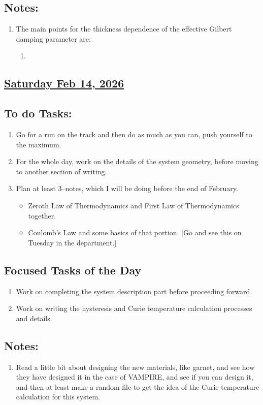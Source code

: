 \subsection*{Notes:}
\begin{enumerate}
    \item The main points for the thickness dependence of the effective Gilbert damping parameter are:
    \begin{enumerate}[\ding{212}]
        \item 
    \end{enumerate}
\end{enumerate}
\subsection*{\underline{Saturday Feb 14, 2026} }
\subsection*{To do Tasks:}
\begin{enumerate}
  \item Go for a run on the track and then do as much as you can, push yourself to the maximum. \cmark
  \item For the whole day, work on the details of the system geometry, before moving to another section of writing. \xmark    
\item Plan at least 3--notes, which I will be doing before the end of February. 
    \begin{itemize}
        \item Zeroth Law of Thermodynamics and First Law of Thermodynamics together.
        \item Coulomb's Law and some basics of that portion. [Go and see this on Tuesday in the  department.]
    \end{itemize}  
\end{enumerate}
\subsection*{Focused Tasks of the Day}
\begin{enumerate}[\ding{52}]  %
    \item Work on completing the system description part before proceeding forward.
    \item Work on writing the hysteresis and Curie temperature calculation processes and details.  
\end{enumerate}
\subsection*{Notes:}
\begin{enumerate}
    \item Read a little bit about designing the new materials, like garnet, and see how they have designed it in the case of VAMPIRE, and see if you can design it, and then at least make a random file to get the idea of the Curie temperature calculation for this system. 
\end{enumerate}
\stardivider